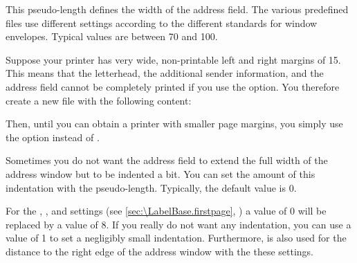 \begin{Declaration}
\end{Declaration}
This pseudo-length defines the width of the address field. The various
predefined  files use different settings according to the different
standards for window envelopes. Typical values are between 70 and
100.
\begin{Example}
  Suppose your printer has very wide, non-printable left and right margins of 15.
  This means that the letterhead, the additional sender information, and the address field cannot
  be completely printed if you use the  option. You therefore
  create a new  file with the following content:
  Then, until you can obtain a printer with smaller page margins, you
  simply use the option  instead of .%
\end{Example}%
%
\EndIndexGroup


\begin{Declaration}
\end{Declaration}
Sometimes you do not want the address field to extend the full width of the
address window but to be indented a bit. You can set the amount of this
indentation with the  pseudo-length. Typically, the
default value is 0.

For the
,
%
, and
%
 settings (see
\autoref{sec:\LabelBase.firstpage}, ) a
value of 0 will be replaced by a value of 8. If you really
do not want any indentation, you can use a value of 1 to set a
negligibly small indentation. Furthermore,  is also used
for the distance to the right edge of the address window with the these
 settings.%
\EndIndexGroup


